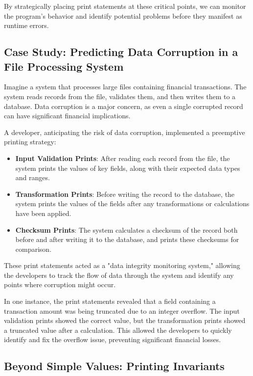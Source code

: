 \documentclass{article}
\begin{document}
{{{{By strategically placing print statements at these critical points, we can monitor the program's behavior and identify potential problems before they manifest as runtime errors.

\subsection*{Case Study: Predicting Data Corruption in a File Processing System}

Imagine a system that processes large files containing financial transactions. The system reads records from the file, validates them, and then writes them to a database. Data corruption is a major concern, as even a single corrupted record can have significant financial implications.

A developer, anticipating the risk of data corruption, implemented a preemptive printing strategy:

\begin{itemize}
    \item \textbf{Input Validation Prints}: After reading each record from the file, the system prints the values of key fields, along with their expected data types and ranges.
    \item \textbf{Transformation Prints}: Before writing the record to the database, the system prints the values of the fields after any transformations or calculations have been applied.
    \item \textbf{Checksum Prints}: The system calculates a checksum of the record both before and after writing it to the database, and prints these checksums for comparison.
\end{itemize}

These print statements acted as a "data integrity monitoring system," allowing the developers to track the flow of data through the system and identify any points where corruption might occur.

In one instance, the print statements revealed that a field containing a transaction amount was being truncated due to an integer overflow. The input validation prints showed the correct value, but the transformation prints showed a truncated value after a calculation. This allowed the developers to quickly identify and fix the overflow issue, preventing significant financial losses.

\subsection*{Beyond Simple Values: Printing Invariants}

}}}}
\end{document}
